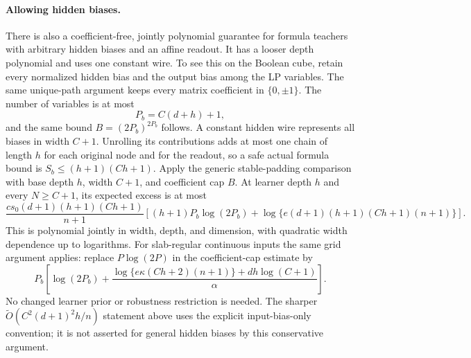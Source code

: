 \paragraph{Allowing hidden biases.}
There is also a coefficient-free, jointly polynomial guarantee for formula teachers with arbitrary hidden biases and an affine readout. It has a looser depth polynomial and uses one constant wire. To see this on the Boolean cube, retain every normalized hidden bias and the output bias among the LP variables. The same unique-path argument keeps every matrix coefficient in $\{0,\pm1\}$. The number of variables is at most
\[
 P_b=C(d+h)+1,
\]
and the same bound $B=(2P_b)^{2P_b}$ follows. A constant hidden wire represents all biases in width $C+1$. Unrolling its contributions adds at most one chain of length $h$ for each original node and for the readout, so a safe actual formula bound is
$S_b\le(h+1)(Ch+1)$.
Apply the generic stable-padding comparison with base depth $h$, width $C+1$, and coefficient cap $B$. At learner depth $h$ and every $N\ge C+1$, its expected excess is at most
\[
 \frac{c s_0(d+1)(h+1)(Ch+1)}{n+1}
 \left[(h+1)P_b\log(2P_b)
              +\log\{e(d+1)(h+1)(Ch+1)(n+1)\}\right].
\]
This is polynomial jointly in width, depth, and dimension, with quadratic width dependence up to logarithms. For slab-regular continuous inputs the same grid argument applies: replace $P\log(2P)$ in the coefficient-cap estimate by
\[
 P_b\left[\log(2P_b)+
       \frac{\log\{e\kappa(Ch+2)(n+1)\}+dh\log(C+1)}\alpha\right].
\]
No changed learner prior or robustness restriction is needed. The sharper $\widetilde O(C^2(d+1)^2h/n)$ statement above uses the explicit input-bias-only convention; it is not asserted for general hidden biases by this conservative argument.
